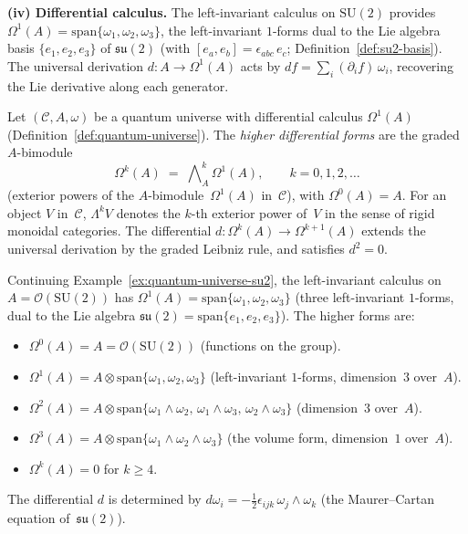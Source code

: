\begin{example}
\medskip\noindent\textbf{(iv) Differential calculus.}\;
The left-invariant calculus on $\mathrm{SU}(2)$ provides
$\Omega^1(A) = \mathrm{span}\{\omega_1, \omega_2, \omega_3\}$,
the left-invariant $1$-forms dual to the Lie algebra basis
$\{e_1, e_2, e_3\}$ of $\mathfrak{su}(2)$ (with
$[e_a, e_b] = \epsilon_{abc}\, e_c$;
Definition~\ref{def:su2-basis}).
The universal derivation $d \colon A \to \Omega^1(A)$
acts by $df = \sum_i (\partial_i f)\, \omega_i$, recovering the
Lie derivative along each generator.
\end{example}

\begin{definition}
\label{def:higher-forms}
\leanok
Let $(\mathcal{C}, A, \omega)$ be a quantum universe with differential
calculus $\Omega^1(A)$ (Definition~\ref{def:quantum-universe}).  The
\emph{higher differential forms} are the graded $A$-bimodule
\[
  \Omega^k(A) \;=\; \bigwedge\nolimits_A^k \Omega^1(A),
  \qquad k = 0, 1, 2, \ldots
\]
(exterior powers of the $A$-bimodule~$\Omega^1(A)$ in~$\mathcal{C}$),
with $\Omega^0(A) = A$.  For an object $V$ in~$\mathcal{C}$,
$\Lambda^k V$ denotes the $k$-th exterior power of~$V$ in the sense
of rigid monoidal categories.  The differential
$d \colon \Omega^k(A) \to \Omega^{k+1}(A)$ extends the universal
derivation by the graded Leibniz rule, and satisfies $d^2 = 0$.
\end{definition}

\begin{example}
\label{ex:higher-forms-su2}
Continuing Example~\ref{ex:quantum-universe-su2}, the left-invariant
calculus on $A = \mathcal{O}(\mathrm{SU}(2))$ has
$\Omega^1(A) = \mathrm{span}\{\omega_1, \omega_2, \omega_3\}$
(three left-invariant $1$-forms, dual to the Lie algebra
$\mathfrak{su}(2) = \mathrm{span}\{e_1, e_2, e_3\}$).  The higher
forms are:
\begin{itemize}
  \item $\Omega^0(A) = A = \mathcal{O}(\mathrm{SU}(2))$ (functions on the group).
  \item $\Omega^1(A) = A \otimes \mathrm{span}\{\omega_1, \omega_2, \omega_3\}$
        (left-invariant $1$-forms, dimension~$3$ over~$A$).
  \item $\Omega^2(A) = A \otimes \mathrm{span}\{\omega_1 \wedge \omega_2,\,
        \omega_1 \wedge \omega_3,\, \omega_2 \wedge \omega_3\}$
        (dimension~$3$ over~$A$).
  \item $\Omega^3(A) = A \otimes \mathrm{span}\{\omega_1 \wedge \omega_2 \wedge
        \omega_3\}$ (the volume form, dimension~$1$ over~$A$).
  \item $\Omega^k(A) = 0$ for $k \geq 4$.
\end{itemize}
The differential $d$ is determined by $d\omega_i = -\tfrac{1}{2}
\epsilon_{ijk}\,\omega_j \wedge \omega_k$ (the Maurer--Cartan equation
of~$\mathfrak{su}(2)$).
\end{example}

